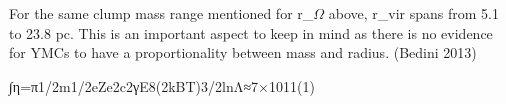 For the same clump mass range mentioned for r_{$\Omega$} above, r_{vir} spans from 5.1 to 23.8 pc. This is an important aspect to keep in mind as there is no evidence for YMCs to have a proportionality between mass and radius. (Bedini 2013)

∫η=π1/2m1/2eZe2c2γE8(2kBT)3/2lnΛ≈7×1011(1)

